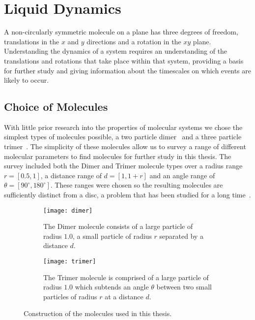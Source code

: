 \chapter{Liquid Dynamics}

A non-circularly symmetric molecule on a plane has three degrees of freedom, translations in the $x$ and $y$ directions and a rotation in the $xy$ plane. Understanding the dynamics of a system requires an understanding of the translations and rotations that take place within that system, providing a basis for further study and giving information about the timescales on which events are likely to occur.

\section{Choice of Molecules}

With little prior research into the properties of molecular systems we chose the simplest types of molecules possible, a two particle dimer~ and a three particle trimer~. The simplicity of these molecules allow us to survey a range of different molecular parameters to find molecules for further study in this thesis. The survey included both the Dimer and Trimer molecule types over a radius range $r = [0.5,1]$, a distance range of $d = [1,1+r]$ and an angle range of $\theta = [90^\circ,180^\circ]$. These ranges were chosen so the resulting molecules are sufficiently distinct from a disc, a problem that has been studied for a long time~\cite{verlet:67}.

\begin{figure}
    \centering
    \begin{subfigure}[t]{0.48\textwidth}
        \texttt{[image: dimer]}
        \caption{The Dimer molecule consists of a large particle of radius $1.0$, a small particle of radius $r$ separated by a distance $d$.}
        \label{fig:dimer}
    \end{subfigure}\hfill
    \begin{subfigure}[t]{0.48\textwidth}
        \texttt{[image: trimer]}
        \caption{The Trimer molecule is comprised of a large particle of radius $1.0$ which subtends an angle $\theta$ between two small particles of radius $r$ at a distance $d$.}
        \label{fig:trimer}
    \end{subfigure}
    \caption{Construction of the molecules used in this thesis.}
    \label{fig:construction}
\end{figure}

